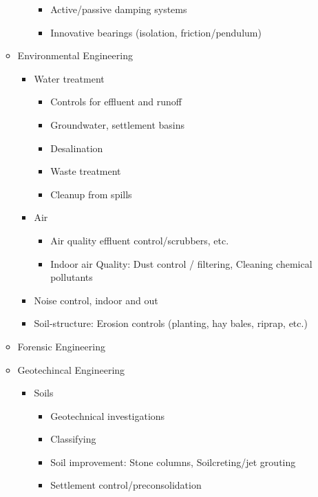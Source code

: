 \documentclass{article}
\begin{document}
\begin{itemize}
\begin{itemize}
\begin{itemize}
            \begin{itemize}
                \item Active/passive damping systems
                \item Innovative bearings (isolation, friction/pendulum)
            \end{itemize}
        \end{itemize}
        \item Environmental Engineering
        \begin{itemize}
            \item Water treatment
            \begin{itemize}
                \item Controls for effluent and runoff
                \item Groundwater, settlement basins
                \item Desalination
                \item Waste treatment
                \item Cleanup from spills
            \end{itemize}
            \item Air
            \begin{itemize}
                \item Air quality effluent control/scrubbers, etc.
                \item Indoor air Quality: Dust control / filtering, Cleaning chemical pollutants
            \end{itemize}
            \item Noise control, indoor and out
            \item Soil-structure: Erosion controls (planting, hay bales, riprap, etc.)
        \end{itemize}
        \item Forensic Engineering
        \item Geotechincal Engineering
        \begin{itemize}
            \item Soils
            \begin{itemize}
                \item Geotechnical investigations
                \item Classifying
                \item Soil improvement: Stone columns, Soilcreting/jet grouting
                \item Settlement control/preconsolidation

\end{itemize}
\end{itemize}
\end{itemize}
\end{itemize}
\end{document}
